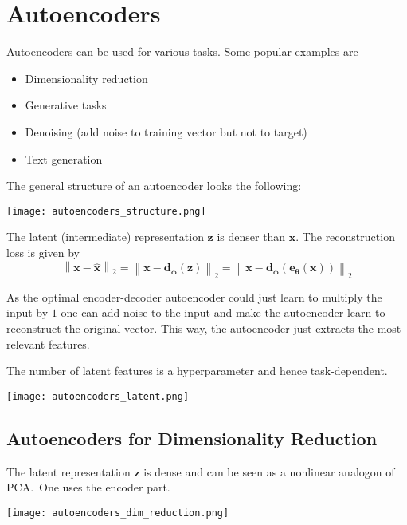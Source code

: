 \section{Autoencoders}
Autoencoders can be used for various tasks. Some popular examples are 
\begin{itemize}
    \item Dimensionality reduction
    \item Generative tasks
    \item Denoising (add noise to training vector but not to target)
    \item Text generation
\end{itemize}
The general structure of an autoencoder looks the following:
\begin{center}
    \texttt{[image: autoencoders\_structure.png]}
\end{center}
The latent (intermediate) representation $\mathbf{z}$ is denser than $\mathbf{x}$. The reconstruction loss is given by
\begin{equation*}
    \left\|\mathbf{x}-\hat{\mathbf{x}}\right\|_2=\left\|\mathbf{x}-\mathbf{d_\phi}(\mathbf{z})\right\|_2=\left\|\mathbf{x}-\mathbf{d_\phi}(\mathbf{e_\theta}(\mathbf{x}))\right\|_2
\end{equation*}

\newpar{}

As the optimal encoder-decoder autoencoder could just learn to multiply the input by $1$ one can add noise to the input and make the autoencoder learn to reconstruct the original vector. This way, the autoencoder just extracts the most relevant features.

\newpar{}

The number of latent features is a hyperparameter and hence task-dependent.
\begin{center}
    \texttt{[image: autoencoders\_latent.png]}
\end{center}

\subsection{Autoencoders for Dimensionality Reduction}
The latent representation $\mathbf{z}$ is dense and can be seen as a nonlinear analogon of PCA.\ One uses the encoder part.
\begin{center}
    \texttt{[image: autoencoders\_dim\_reduction.png]}
\end{center}

